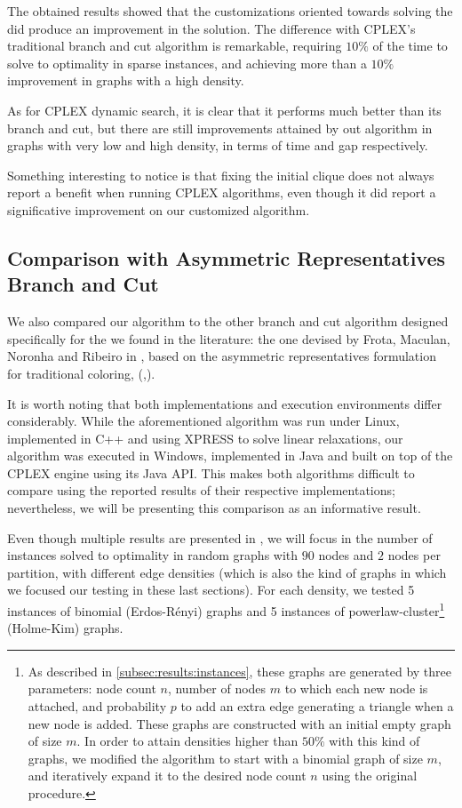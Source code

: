 The obtained results showed that the customizations oriented towards solving the \PCP{} did produce an improvement in the solution. The difference with \textsc{CPLEX}'s traditional branch and cut algorithm is remarkable, requiring $10\%$ of the time to solve to optimality in sparse instances, and achieving more than a $10\%$ improvement in graphs with a high density.

As for \textsc{CPLEX} dynamic search, it is clear that it performs much better than its branch and cut, but there are still improvements attained by out algorithm in graphs with very low and high density, in terms of time and gap respectively.

Something interesting to notice is that fixing the initial clique does not always report a benefit when running \textsc{CPLEX} algorithms, even though it did report a significative improvement on our customized algorithm.

\subsection{Comparison with Asymmetric Representatives Branch and Cut}

We also compared our algorithm to the other branch and cut algorithm designed specifically for the \PCP{} we found in the literature: the one devised by Frota, Maculan, Noronha and Ribeiro in \cite{frota2010branch}, based on the asymmetric representatives formulation for traditional coloring, (\cite{campelo2004cliques},\cite{campelo2008asymmetric}).

It is worth noting that both implementations and execution environments differ considerably. While the aforementioned algorithm was run under Linux, implemented in C++ and  using \textsc{XPRESS} to solve linear relaxations, our algorithm was executed in Windows, implemented in Java and built on top of the \textsc{CPLEX} engine using its Java API. This makes both algorithms difficult to compare using the reported results of their respective implementations; nevertheless, we will be presenting this comparison as an informative result.

Even though multiple results are presented in \cite{frota2010branch}, we will focus in the number of instances solved to optimality in random graphs with $90$ nodes and $2$ nodes per partition, with different edge densities (which is also the kind of graphs in which we focused our testing in these last sections). For each density, we tested 5 instances of binomial (Erdos-R\'enyi) graphs and 5 instances of powerlaw-cluster\footnote{As described in \ref{subsec:results:instances}, these graphs are generated by three parameters: node count $n$, number of nodes $m$ to which each new node is attached, and probability $p$ to add an extra edge generating a triangle when a new node is added. These graphs are constructed with an initial empty graph of size $m$. In order to attain densities higher than $50\%$ with this kind of graphs, we modified the algorithm to start with a binomial graph of size $m$, and iteratively expand it to the desired node count $n$ using the original procedure.} (Holme-Kim) graphs.

